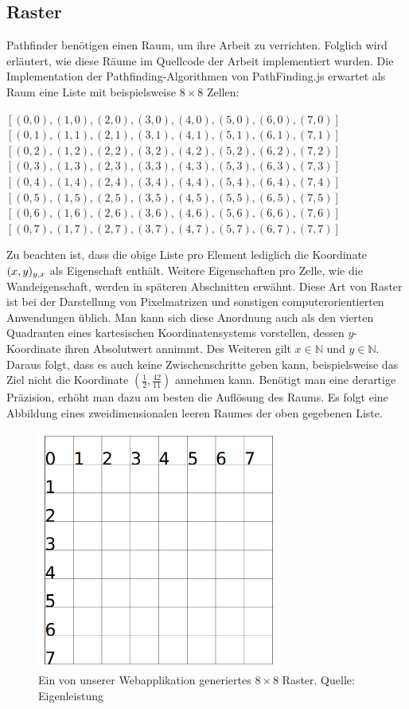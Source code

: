 \documentclass[12pt,a4paper,german]{report}
\begin{document}
\subsection{Raster}
Pathfinder benötigen einen Raum, um ihre Arbeit zu verrichten. Folglich wird erläutert, wie diese Räume im Quellcode der Arbeit implementiert wurden.
Die Implementation der Pathfinding-Algorithmen von PathFinding.js erwartet als Raum eine Liste mit beispielsweise $8\times8$ Zellen: \\
\begin{center}
$[(0,0),(1,0),(2,0),(3,0),(4,0),(5,0),(6,0),(7,0)]$\\
$[(0,1),(1,1),(2,1),(3,1),(4,1),(5,1),(6,1),(7,1)]$\\
$[(0,2),(1,2),(2,2),(3,2),(4,2),(5,2),(6,2),(7,2)]$\\
$[(0,3),(1,3),(2,3),(3,3),(4,3),(5,3),(6,3),(7,3)]$\\
$[(0,4),(1,4),(2,4),(3,4),(4,4),(5,4),(6,4),(7,4)]$\\
$[(0,5),(1,5),(2,5),(3,5),(4,5),(5,5),(6,5),(7,5)]$\\
$[(0,6),(1,6),(2,6),(3,6),(4,6),(5,6),(6,6),(7,6)]$\\
$[(0,7),(1,7),(2,7),(3,7),(4,7),(5,7),(6,7),(7,7)]$
\end{center}
Zu beachten ist, dass die obige Liste pro Element lediglich die Koordinate $(x,y)\textsubscript{$y$,$x$}$ als Eigenschaft enthält. Weitere Eigenschaften pro Zelle, wie die Wandeigenschaft, werden in späteren Abschnitten erwähnt.
Diese Art von Raster ist bei der Darstellung von Pixelmatrizen und sonstigen computerorientierten Anwendungen üblich. 
Man kann sich diese Anordnung auch als den vierten Quadranten eines kartesischen Koordinatensystems vorstellen, dessen $y$-Koordinate ihren Absolutwert annimmt. 
Des Weiteren gilt $x \in \mathbb{N}$ und $y \in \mathbb{N}$. 
Daraus folgt, dass es auch keine Zwischenschritte geben kann, beispielsweise das Ziel nicht die Koordinate $(\frac{1}{2},\frac{42}{11})$ annehmen kann. 
Benötigt man eine derartige Präzision, erhöht man dazu am besten die Auflösung des Raums. Es folgt eine Abbildung eines zweidimensionalen leeren Raumes der oben gegebenen Liste.
\begin{figure}[H]
  \centering
  \includegraphics[width=8cm]{grid1}
  \caption[Ein von unserer Webapplikation generiertes $8\times8$ Raster.]{Ein von unserer Webapplikation generiertes $8\times8$ Raster. Quelle: Eigenleistung}
  \label{fig:grid1}
\end{figure}
\end{document}
